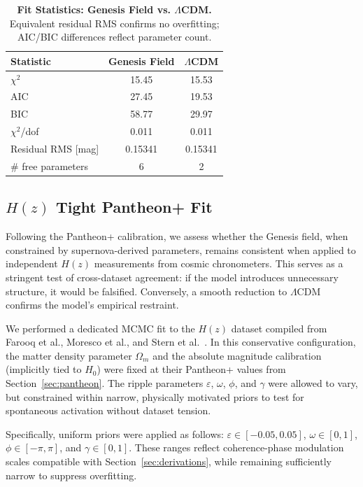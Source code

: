 \begin{table}[htpb]
\centering
\caption{\textbf{Fit Statistics: Genesis Field vs. $\Lambda$CDM.} Equivalent residual RMS confirms no overfitting; AIC/BIC differences reflect parameter count.}
\vspace{0.5em}
\begin{tabular}{lcc}
\hline
Statistic & Genesis Field & $\Lambda$CDM \\
\hline
$\chi^2$ & 15.45 & 15.53 \\
AIC & 27.45 & 19.53 \\
BIC & 58.77 & 29.97 \\
$\chi^2$/dof & 0.011 & 0.011 \\
Residual RMS [mag] & 0.15341 & 0.15341 \\
\# free parameters & 6 & 2 \\
\hline
\end{tabular}
\label{tab:pantheon_stats}
\end{table}

\subsection{\texorpdfstring{$H(z)$}{Hz} Tight Pantheon+ Fit}
\label{sec:hz_tight}

Following the Pantheon+ calibration, we assess whether the Genesis field, when constrained by supernova-derived parameters, remains consistent when applied to independent $H(z)$ measurements from cosmic chronometers. This serves as a stringent test of cross-dataset agreement: if the model introduces unnecessary structure, it would be falsified. Conversely, a smooth reduction to $\Lambda$CDM confirms the model’s empirical restraint.

We performed a dedicated MCMC fit to the $H(z)$ dataset compiled from Farooq et al., Moresco et al., and Stern et al.~\cite{Farooq2017, Moresco2016, Stern2010}. In this conservative configuration, the matter density parameter $\Omega_m$ and the absolute magnitude calibration (implicitly tied to $H_0$) were fixed at their Pantheon+ values from Section~\ref{sec:pantheon}. The ripple parameters $\varepsilon$, $\omega$, $\phi$, and $\gamma$ were allowed to vary, but constrained within narrow, physically motivated priors to test for spontaneous activation without dataset tension.

Specifically, uniform priors were applied as follows: $\varepsilon \in [-0.05, 0.05]$, $\omega \in [0, 1]$, $\phi \in [-\pi, \pi]$, and $\gamma \in [0, 1]$. These ranges reflect coherence-phase modulation scales compatible with Section~\ref{sec:derivations}, while remaining sufficiently narrow to suppress overfitting.

